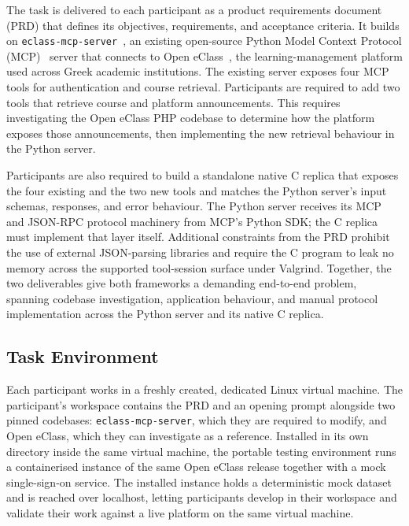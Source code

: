 The task is delivered to each participant as a product requirements document (PRD) that defines its objectives, requirements, and acceptance criteria. It builds on \texttt{eclass-mcp-server}~\cite{chaidemenos2026eclassmcp}, an existing open-source Python Model Context Protocol (MCP)~\cite{mcp2025spec} server that connects to Open eClass~\cite{gunet2026openeclass}, the learning-management platform used across Greek academic institutions. The existing server exposes four MCP tools for authentication and course retrieval. Participants are required to add two tools that retrieve course and platform announcements. This requires investigating the Open eClass PHP codebase to determine how the platform exposes those announcements, then implementing the new retrieval behaviour in the Python server.

Participants are also required to build a standalone native C replica that exposes the four existing and the two new tools and matches the Python server's input schemas, responses, and error behaviour. The Python server receives its MCP and JSON-RPC protocol machinery from MCP's Python SDK; the C replica must implement that layer itself. Additional constraints from the PRD prohibit the use of external JSON-parsing libraries and require the C program to leak no memory across the supported tool-session surface under Valgrind. Together, the two deliverables give both frameworks a demanding end-to-end problem, spanning codebase investigation, application behaviour, and manual protocol implementation across the Python server and its native C replica.

\subsection{Task Environment}
\label{sec:evaluation-task-environment}

Each participant works in a freshly created, dedicated Linux virtual machine. The participant's workspace contains the PRD and an opening prompt alongside two pinned codebases: \texttt{eclass-mcp-server}, which they are required to modify, and Open eClass, which they can investigate as a reference. Installed in its own directory inside the same virtual machine, the portable testing environment runs a containerised instance of the same Open eClass release together with a mock single-sign-on service. The installed instance holds a deterministic mock dataset and is reached over localhost, letting participants develop in their workspace and validate their work against a live platform on the same virtual machine.

